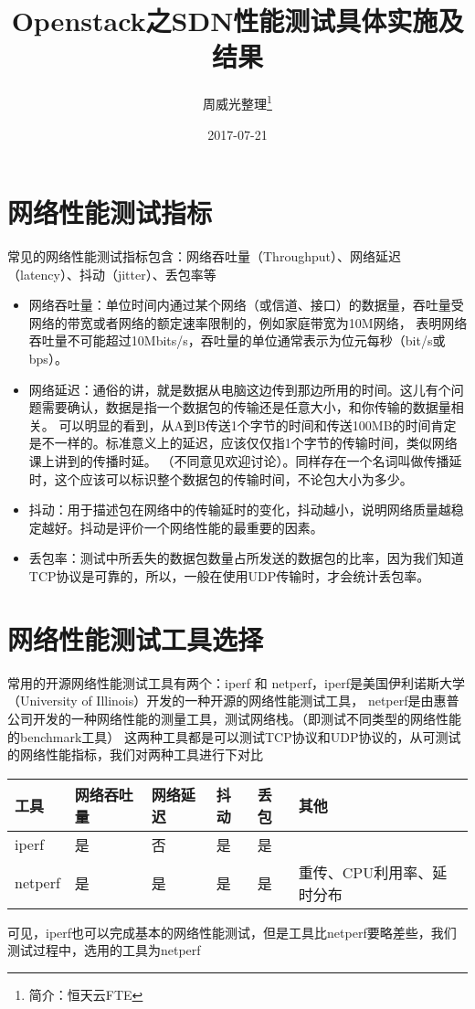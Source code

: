 \documentclass[a4paper,left=1.5cm,right=1.5cm,11pt]{article}
\title{Openstack之SDN性能测试具体实施及结果}
\author{周威光整理\footnote{简介：恒天云FTE}}
\date{2017-07-21}
\begin{document}
\maketitle
\clearpage
\tableofcontents
\clearpage
\section{网络性能测试指标}
常见的网络性能测试指标包含：网络吞吐量（Throughput）、网络延迟（latency）、抖动（jitter）、丢包率等
\begin{itemize}
	\item[1.]网络吞吐量：单位时间内通过某个网络（或信道、接口）的数据量，吞吐量受网络的带宽或者网络的额定速率限制的，例如家庭带宽为10M网络，
	表明网络吞吐量不可能超过10Mbits/s，吞吐量的单位通常表示为位元每秒（bit/s或bps）。
	\item[2.]网络延迟：通俗的讲，就是数据从电脑这边传到那边所用的时间。这儿有个问题需要确认，数据是指一个数据包的传输还是任意大小，和你传输的数据量相关。
	可以明显的看到，从A到B传送1个字节的时间和传送100MB的时间肯定是不一样的。标准意义上的延迟，应该仅仅指1个字节的传输时间，类似网络课上讲到的传播时延。
	（不同意见欢迎讨论）。同样存在一个名词叫做传播延时，这个应该可以标识整个数据包的传输时间，不论包大小为多少。
	\item[3.]抖动：用于描述包在网络中的传输延时的变化，抖动越小，说明网络质量越稳定越好。抖动是评价一个网络性能的最重要的因素。
	\item[4.]丢包率：测试中所丢失的数据包数量占所发送的数据包的比率，因为我们知道TCP协议是可靠的，所以，一般在使用UDP传输时，才会统计丢包率。
\end{itemize}
\section{网络性能测试工具选择}
常用的开源网络性能测试工具有两个：iperf 和 netperf，iperf是美国伊利诺斯大学（University of Illinois）开发的一种开源的网络性能测试工具，
netperf是由惠普公司开发的一种网络性能的测量工具，测试网络栈。（即测试不同类型的网络性能的benchmark工具）
这两种工具都是可以测试TCP协议和UDP协议的，从可测试的网络性能指标，我们对两种工具进行下对比
\begin{center}
\begin{tabular}[c]{l|l|l|l|l|l}
工具 & 网络吞吐量 & 网络延迟 & 抖动 & 丢包 & 其他\\
\hline
iperf & 是 & 否 & 是 & 是 & \\
\hline
netperf & 是 & 是 & 是 & 是 & 重传、CPU利用率、延时分布 \\
\hline
\end{tabular}
\end{center}
可见，iperf也可以完成基本的网络性能测试，但是工具比netperf要略差些，我们测试过程中，选用的工具为netperf
\end{document}
